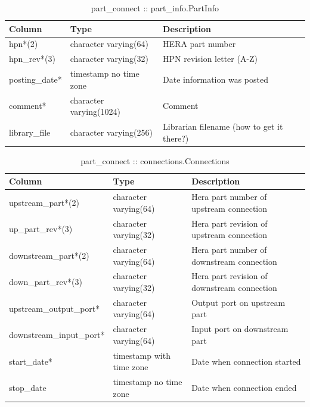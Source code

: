 \documentclass{article}
\begin{document}
\begin{table}[h]
\centering
\caption{part\_connect :: part\_info.PartInfo}
\begin{tabular}{| l | l | l |} \hline
{\bf Column} & {\bf Type} & {\bf Description} \\ \hline
hpn*(2) & character varying(64) & HERA part number \\ \hline
hpn\_rev*(3) & character varying(32) & HPN revision letter (A-Z) \\ \hline
posting\_date* & timestamp no time zone & Date information was posted \\ \hline
comment* &  character varying(1024) & Comment \\ \hline
library\_file & character varying(256) &  Librarian filename (how to get it there?) \\ \hline
\end{tabular}
\end{table}

\begin{table}[h]
\centering
\caption{part\_connect :: connections.Connections}
\begin{tabular}{| l | l | l |} \hline
{\bf Column} & {\bf Type} & {\bf Description} \\ \hline
upstream\_part*(2) &  character varying(64) & Hera part number of upstream connection \\ \hline
up\_part\_rev*(3) & character varying(32) & Hera part revision of upstream connection \\ \hline
downstream\_part*(2) & character varying(64) & Hera part number of downstream connection \\ \hline
down\_part\_rev*(3) & character varying(32) & Hera part revision of downstream connection \\ \hline
upstream\_output\_port* & character varying(64) & Output port on upstream part \\ \hline
downstream\_input\_port* & character varying(64) & Input port on downstream part \\ \hline
start\_date* & timestamp with time zone & Date when connection started \\ \hline
stop\_date & timestamp no time zone & Date when connection ended \\ \hline
\end{tabular}
\end{table}
\end{document}
